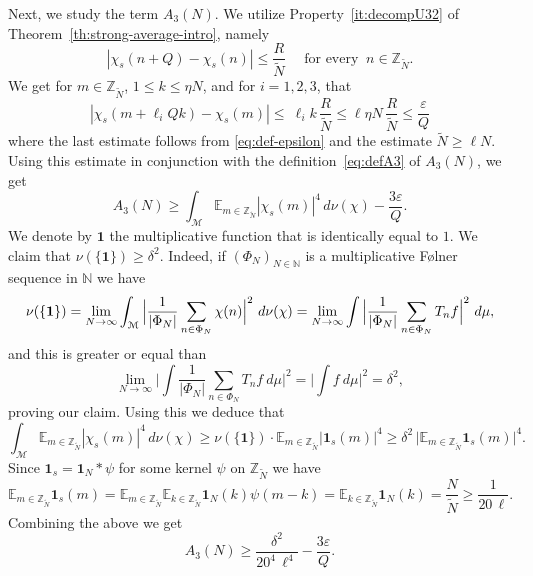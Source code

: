 \documentclass[11pt]{amsart}
\theoremstyle{definition}
\begin{document}
Next, we study the term $A_3(N)$.  We utilize Property~\eqref{it:decompU32} of
Theorem~\ref{th:strong-average-intro}, namely
$$
|\chi_s(n+Q)-\chi_s(n)|\leq \frac{R}{{\widetilde N}} \quad \text{ for  every } \ n\in{{{\mathbb Z}}_{\widetilde N}}.
$$
We get for $m\in {{{\mathbb Z}}_{\widetilde N}}$, $1\leq k\leq\eta N$,  and for $i=1,2,3$, that
$$
|\chi_s(m+\ell_i Qk)-\chi_s(m)|\leq\ \ell_ik\,\frac {R}{{\widetilde N}}\leq \ell
\eta N\,\frac {R}{{\widetilde N}} \leq \frac {\varepsilon} Q
$$
where the last estimate follows from \eqref{eq:def-epsilon} and the estimate ${{\widetilde N}}\geq \ell N$.
Using this estimate in conjunction with the definition~\eqref{eq:defA3} of $A_3(N)$, we get
$$
A_3(N)\geq \int_{{\mathcal M}}{{\mathbb E}}_{m\in{{{\mathbb Z}}_{\widetilde N}}}|\chi_{s}(m)|^4\,d\nu(\chi)
-\frac{3{\varepsilon}}Q.
$$
  We
 denote by ${\mathbf{1}}$  the multiplicative function that is identically
 equal  to $1$.
 We claim that
$\nu(\{{\mathbf{1}}\})\geq\delta^2$. Indeed,  if $(\Phi_N)_{N\in {{\mathbb N}}}$ is a
multiplicative F\o lner sequence in ${{\mathbb N}}$ we have
$$
\nu(\{{\bf 1}\})=\lim_{N\to\infty} \int_{{\mathcal M}}
\Big|\frac{1}{|\Phi_N|}\sum_{n\in \Phi_N} \chi(n)\Big|^2 \
d\nu(\chi)= \lim_{N\to\infty} \int
\Big|\frac{1}{|\Phi_N|}\sum_{n\in \Phi_N} T_nf \Big|^2\ d\mu,
$$  and this is greater or equal than
$$ \lim_{N\to\infty}
\Big|\int \frac{1}{|\Phi_N|}\sum_{n\in \Phi_N} T_nf \ d\mu \Big|^2=
\Big|\int f \ d\mu\Big|^2=\delta^2,$$ proving our claim. Using this
we deduce that
$$
\int_{{\mathcal M}}{{\mathbb E}}_{m\in{{{\mathbb Z}}_{\widetilde N}}}|\chi_{s}(m)|^4\,d\nu(\chi)\geq
\nu(\{{\mathbf{1}}\}) \cdot{{\mathbb E}}_{m\in{{{\mathbb Z}}_{\widetilde N}}} |{\mathbf{1}}_s(m)|^4
\geq \delta^2\, \bigl|{{\mathbb E}}_{m\in{{{\mathbb Z}}_{\widetilde N}}} {\mathbf{1}}_s(m)|^4.
$$
Since ${\mathbf{1}}_s={\mathbf{1}}_N*\psi$ for some kernel $\psi$  on ${{{\mathbb Z}}_{\widetilde N}}$ we have
$${{\mathbb E}}_{m\in{{{\mathbb Z}}_{\widetilde N}}}{\mathbf{1}}_s(m)=
{{\mathbb E}}_{m\in{{{\mathbb Z}}_{\widetilde N}}}{{\mathbb E}}_{k\in{{{\mathbb Z}}_{\widetilde N}}}{\mathbf{1}}_N(k)\psi(m-k)=
{{\mathbb E}}_{k\in{{{\mathbb Z}}_{\widetilde N}}}{\mathbf{1}}_N(k) =
\frac N{{\widetilde N}}\geq \frac 1{20\,\ell}.
$$
Combining the above we get
\begin{equation}
\label{eq:A3b} A_3(N)\geq  \frac
{\delta^2}{20^4\,\ell^4}-\frac{3{\varepsilon} }Q.
\end{equation}
\end{document}
